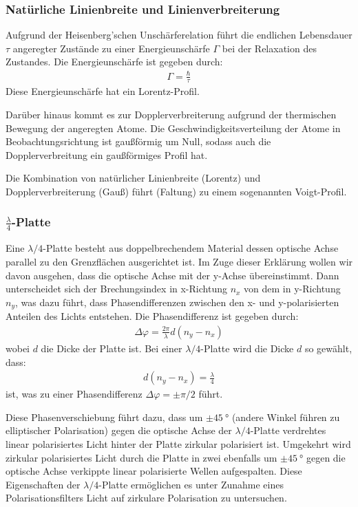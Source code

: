 \documentclass[11pt, a4paper]{article}
\begin{document}
\subsubsection{Natürliche Linienbreite und Linienverbreiterung}
Aufgrund der Heisenberg'schen Unschärferelation führt die endlichen Lebensdauer $\tau$ angeregter Zustände zu einer Energieunschärfe $\Gamma$ bei der Relaxation des Zustandes.
Die Energieunschärfe ist gegeben durch:
\begin{align}
	\Gamma = \frac{\hbar}{\tau}
\end{align}
Diese Energieunschärfe hat ein Lorentz-Profil.

Darüber hinaus kommt es zur Dopplerverbreiterung aufgrund der thermischen Bewegung der angeregten Atome.
Die Geschwindigkeitsverteilung der Atome in Beobachtungsrichtung ist gaußförmig um Null, sodass auch die Dopplerverbreitung ein gaußförmiges Profil hat.

Die Kombination von natürlicher Linienbreite (Lorentz) und Dopplerverbreiterung (Gauß) führt (Faltung) zu einem sogenannten Voigt-Profil.

\subsubsection{$\frac{\lambda}{4}$-Platte}
Eine $\lambda/4$-Platte besteht aus doppelbrechendem Material dessen optische Achse parallel zu den Grenzflächen ausgerichtet ist.
Im Zuge dieser Erklärung wollen wir davon ausgehen, dass die optische Achse mit der y-Achse übereinstimmt.
Dann unterscheidet sich der Brechungsindex in x-Richtung $n_x$ von dem in y-Richtung $n_y$, was dazu führt, dass Phasendifferenzen zwischen den x- und y-polarisierten Anteilen des Lichts entstehen.
Die Phasendifferenz ist gegeben durch:
\begin{align}
	\Delta \varphi = \frac{2 \pi}{\lambda} d (n_y - n_x)
\end{align}
wobei $d$ die Dicke der Platte ist.
Bei einer $\lambda / 4$-Platte wird die Dicke $d$ so gewählt, dass:
\begin{align}
	d (n_y - n_x) = \frac{\lambda}{4}
\end{align}
ist, was zu einer Phasendifferenz $\Delta \varphi = \pm \pi / 2$ führt.

Diese Phasenverschiebung führt dazu, dass um $\pm\SI{45}{\degree}$ (andere Winkel führen zu elliptischer Polarisation) gegen die optische Achse der $\lambda/4$-Platte verdrehtes linear polarisiertes Licht hinter der Platte zirkular polarisiert ist.
Umgekehrt wird zirkular polarisiertes Licht durch die Platte in zwei ebenfalls um $\pm\SI{45}{\degree}$ gegen die optische Achse verkippte linear polarisierte Wellen aufgespalten.
Diese Eigenschaften der $\lambda/4$-Platte ermöglichen es unter Zunahme eines Polarisationsfilters Licht auf zirkulare Polarisation zu untersuchen.
\end{document}
